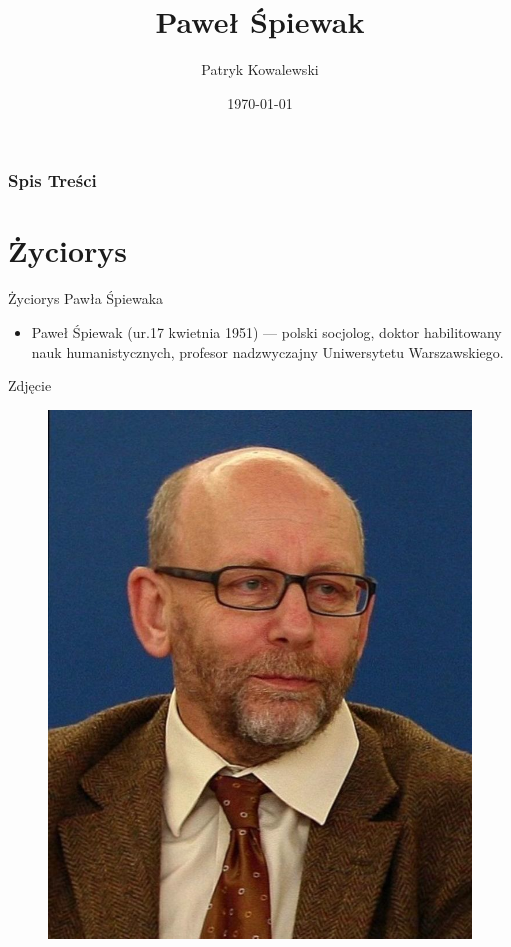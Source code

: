 \documentclass{beamer}
\title{Paweł Śpiewak}
\author{Patryk Kowalewski}
\institute{UWM}
\date{\today}
\begin{document}
\frame{\titlepage}

\begin{frame}
\frametitle{Spis Treści}
\tableofcontents
\end{frame}

\section{Życiorys}
\begin{frame}{Życiorys Pawła Śpiewaka}
\begin {itemize}
\item Paweł Śpiewak (ur.17 kwietnia 1951) --- polski socjolog, doktor habilitowany nauk humanistycznych, profesor nadzwyczajny Uniwersytetu Warszawskiego.
\end {itemize}
\end{frame}

\begin{frame}{Zdjęcie}

\begin{figure}[here]
\begin{center}
\includegraphics[scale=0.6]{pawcio.jpg}
\end{center}
\end{figure}

\end{frame}
\end{document}
